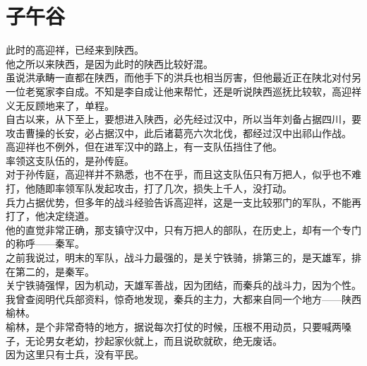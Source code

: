\section{子午谷}
\ifnum{}
	\begin{multicols}{\theparacolNo}
\fi
此时的高迎祥，已经来到陕西。\\

他之所以来陕西，是因为此时的陕西比较好混。\\

虽说洪承畴一直都在陕西，而他手下的洪兵也相当厉害，但他最近正在陕北对付另一位老冤家李自成。不知是李自成让他来帮忙，还是听说陕西巡抚比较软，高迎祥义无反顾地来了，单程。\\

自古以来，从下至上，要想进入陕西，必先经过汉中，所以当年刘备占据四川，要攻击曹操的长安，必占据汉中，此后诸葛亮六次北伐，都经过汉中出祁山作战。\\

高迎祥也不例外，但在进军汉中的路上，有一支队伍挡住了他。\\

率领这支队伍的，是孙传庭。\\

对于孙传庭，高迎祥并不熟悉，也不在乎，而且这支队伍只有万把人，似乎也不难打，他随即率领军队发起攻击，打了几次，损失上千人，没打动。\\

兵力占据优势，但多年的战斗经验告诉高迎祥，这是一支比较邪门的军队，不能再打了，他决定绕道。\\

他的直觉非常正确，那支镇守汉中，只有万把人的部队，在历史上，却有一个专门的称呼——秦军。\\

之前我说过，明末的军队，战斗力最强的，是关宁铁骑，排第三的，是天雄军，排在第二的，是秦军。\\

关宁铁骑强悍，因为机动，天雄军善战，因为团结，而秦兵的战斗力，因为个性。\\

我曾查阅明代兵部资料，惊奇地发现，秦兵的主力，大都来自同一个地方——陕西榆林。\\

榆林，是个非常奇特的地方，据说每次打仗的时候，压根不用动员，只要喊两嗓子，无论男女老幼，抄起家伙就上，而且说砍就砍，绝无废话。\\

因为这里只有士兵，没有平民。\\


\end{multicols}
